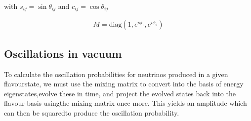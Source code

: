 with $s_{ij}=\sin \theta_{ij}$ and $c_{ij}=\cos \theta_{ij}$

\begin{align} %
    M = \mathrm{diag}(1, e^{i\phi_{1}}, e^{i\phi_{2}})
\end{align} %

\subsection{Oscillations in vacuum}

To calculate the oscillation probabilities for neutrinos produced in a given flavourstate, we must
use the mixing matrix to convert into the basis of energy eigenstates,evolve these in time, and
project the evolved states back into the flavour basis usingthe mixing matrix once more.  This
yields an amplitude which can then be squaredto produce the oscillation probability.

